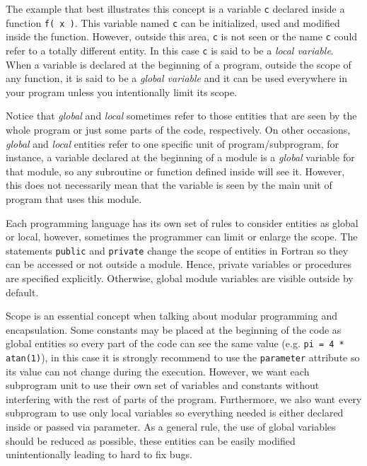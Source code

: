 The example that best illustrates this concept is a variable \texttt{c} declared inside a function \texttt{f( x )}. 
This variable named \texttt{c} can be initialized, used and modified inside the function. 
However, outside this area, \texttt{c} is not seen or the name \texttt{c} could refer to a totally different entity. 
In this case \texttt{c} is said to be a \textit{local variable}.
When a variable is declared at the beginning of a program, outside the scope of any function, it is said to be a \textit{global variable} and it can be used everywhere in your program unless you intentionally limit its scope. 

Notice that \textit{global} and \textit{local} sometimes refer to those entities that are seen by the whole program or just some parts of the code, respectively. 
On other occasions, \textit{global} and \textit{local} entities refer to one specific unit of program/subprogram, for instance, a variable declared at the beginning of a module is a \textit{global} variable for that module, so any subroutine or function defined inside will see it. However, this does not necessarily mean that the variable is seen by the main unit of program that uses this module. 


Each programming language has its own set of rules to consider entities as global or local, however, sometimes the programmer can limit or enlarge the scope.
The statements \texttt{public} and \texttt{private} change the scope of entities in Fortran so they can be accessed or not outside a module.
Hence, private variables or procedures are specified explicitly. Otherwise, global module variables are visible outside by default.   

Scope is an essential concept when talking about modular programming and encapsulation. Some constants may be placed at the beginning of the code as global entities so every part of the code can see the same value (e.g. \texttt{pi = 4 * atan(1)}), in this case it is strongly recommend to use the \texttt{parameter} attribute so its value can not change during the execution. However, we want each subprogram unit to use their own set of variables and constants without interfering with the rest of parts of the program. Furthermore, we also want every subprogram to use only local variables so everything needed is either declared inside or passed via parameter. 
As a general rule, the use of global variables should be reduced as possible, these entities can be easily modified unintentionally leading to hard to fix bugs.  



